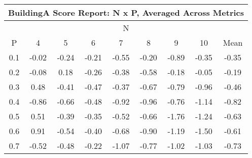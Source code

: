 \begin{longtable}{ | c || c | c | c | c | c | c | c || c |}
\hline
\multicolumn{9}{|c|}{ BuildingA Score Report: N x P, Averaged Across Metrics } \\
\hline
\multicolumn{9}{|c|}{ N } \\
\hline
P & 4 & 5 & 6 & 7 & 8 & 9 & 10 & Mean\\
\hline
\hline
\endhead
0.1 &  \cellcolor[HTML]{FFFFFF} -0.02 &  \cellcolor[HTML]{FFF7F7} -0.24 &  \cellcolor[HTML]{FFF7F7} -0.21 &  \cellcolor[HTML]{FFEFEF} -0.55 &  \cellcolor[HTML]{FFF7F7} -0.20 &  \cellcolor[HTML]{FFE7E7} -0.89 &  \cellcolor[HTML]{FFF7F7} -0.35 &  \cellcolor[HTML]{FFF7F7} -0.35 \\
0.2 &  \cellcolor[HTML]{FFFFFF} -0.08 &  \cellcolor[HTML]{F7F7FF} 0.18 &  \cellcolor[HTML]{FFF7F7} -0.26 &  \cellcolor[HTML]{FFF7F7} -0.38 &  \cellcolor[HTML]{FFEFEF} -0.58 &  \cellcolor[HTML]{FFF7F7} -0.18 &  \cellcolor[HTML]{FFFFFF} -0.05 &  \cellcolor[HTML]{FFF7F7} -0.19 \\
0.3 &  \cellcolor[HTML]{F7F7FF} 0.48 &  \cellcolor[HTML]{FFF7F7} -0.41 &  \cellcolor[HTML]{FFF7F7} -0.47 &  \cellcolor[HTML]{FFF7F7} -0.37 &  \cellcolor[HTML]{FFEFEF} -0.67 &  \cellcolor[HTML]{FFEFEF} -0.79 &  \cellcolor[HTML]{FFE7E7} -0.96 &  \cellcolor[HTML]{FFF7F7} -0.46 \\
0.4 &  \cellcolor[HTML]{FFE7E7} -0.86 &  \cellcolor[HTML]{FFEFEF} -0.66 &  \cellcolor[HTML]{FFEFEF} -0.48 &  \cellcolor[HTML]{FFE7E7} -0.92 &  \cellcolor[HTML]{FFE7E7} -0.96 &  \cellcolor[HTML]{FFEFEF} -0.76 &  \cellcolor[HTML]{FFDFDF} -1.14 &  \cellcolor[HTML]{FFE7E7} -0.82 \\
0.5 &  \cellcolor[HTML]{EFEFFF} 0.51 &  \cellcolor[HTML]{FFF7F7} -0.39 &  \cellcolor[HTML]{FFF7F7} -0.35 &  \cellcolor[HTML]{FFEFEF} -0.52 &  \cellcolor[HTML]{FFEFEF} -0.66 &  \cellcolor[HTML]{FFCFCF} -1.76 &  \cellcolor[HTML]{FFDFDF} -1.24 &  \cellcolor[HTML]{FFEFEF} -0.63 \\
0.6 &  \cellcolor[HTML]{E7E7FF} 0.91 &  \cellcolor[HTML]{FFEFEF} -0.54 &  \cellcolor[HTML]{FFF7F7} -0.40 &  \cellcolor[HTML]{FFEFEF} -0.68 &  \cellcolor[HTML]{FFE7E7} -0.90 &  \cellcolor[HTML]{FFDFDF} -1.19 &  \cellcolor[HTML]{FFD7D7} -1.50 &  \cellcolor[HTML]{FFEFEF} -0.61 \\
0.7 &  \cellcolor[HTML]{FFEFEF} -0.52 &  \cellcolor[HTML]{FFEFEF} -0.48 &  \cellcolor[HTML]{FFF7F7} -0.22 &  \cellcolor[HTML]{FFE7E7} -1.07 &  \cellcolor[HTML]{FFEFEF} -0.77 &  \cellcolor[HTML]{FFE7E7} -1.02 &  \cellcolor[HTML]{FFE7E7} -1.03 &  \cellcolor[HTML]{FFEFEF} -0.73 \\

\end{longtable}
